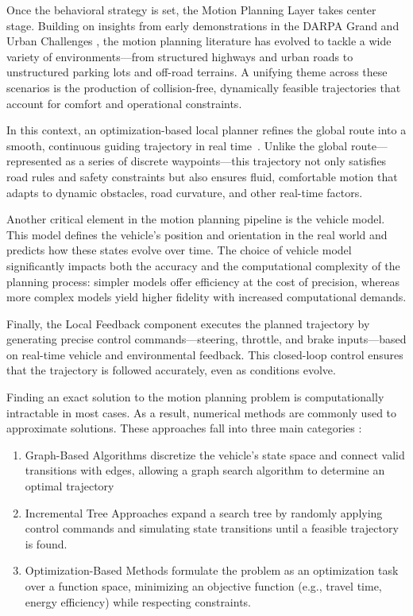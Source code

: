 Once the behavioral strategy is set, the Motion Planning Layer takes center stage.
Building on insights from early demonstrations in the DARPA Grand and Urban Challenges \cite{thrun_stanley_2006,montemerlo_junior_2008}, the motion
planning literature has evolved to tackle a wide variety of environments—from structured highways and urban roads to unstructured parking lots and
off-road terrains.
A unifying theme across these scenarios is the production of collision-free, dynamically feasible trajectories that account for comfort and
operational constraints.

In this context, an optimization-based local planner refines the global route into a smooth, continuous guiding trajectory in real
time~\cite{van_hierarchical_2020}.
Unlike the global route—represented as a series of discrete waypoints—this trajectory not only satisfies road rules and safety constraints but also
ensures fluid, comfortable motion that adapts to dynamic obstacles, road curvature, and other real-time factors.

Another critical element in the motion planning pipeline is the vehicle model.
This model defines the vehicle's position and orientation in the real world and predicts how these states evolve over time.
The choice of vehicle model significantly impacts both the accuracy and the computational complexity of the planning process: simpler models offer
efficiency at the cost of precision, whereas more complex models yield higher fidelity with increased computational demands.

Finally, the Local Feedback component executes the planned trajectory by generating precise control commands—steering, throttle, and brake
inputs—based on real-time vehicle and environmental feedback.
This closed-loop control ensures that the trajectory is followed accurately, even as conditions evolve.

Finding an exact solution to the motion planning problem is computationally intractable in most cases.
As a result, numerical methods are commonly used to approximate solutions.
These approaches fall into three main categories \cite{paden_survey_2016}:

\begin{enumerate}
	\item Graph-Based Algorithms discretize the vehicle's state space and connect valid
	      transitions with edges, allowing a graph search algorithm to determine an optimal
	      trajectory

	\item Incremental Tree Approaches expand a search tree by randomly applying control
	      commands and simulating state transitions until a feasible trajectory is found.

	\item Optimization-Based Methods formulate the problem as an optimization task over a function space, minimizing an objective function (e.g., travel time, energy efficiency)
	      while respecting constraints.
\end{enumerate}

